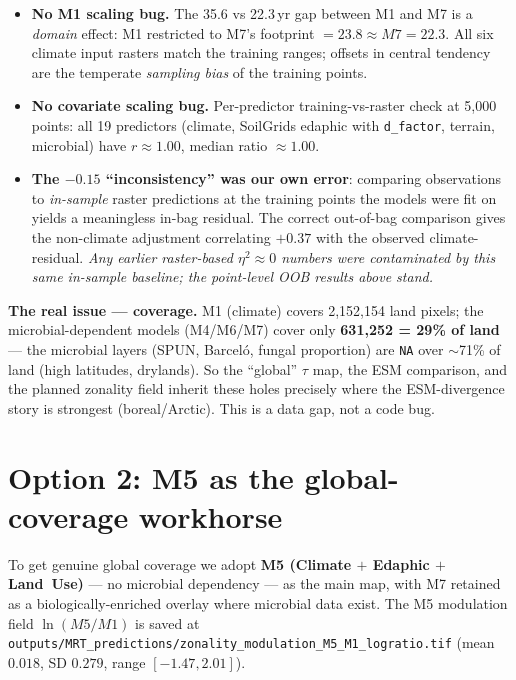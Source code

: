 \documentclass[11pt,a4paper]{article}
\begin{document}
\begin{itemize}[nosep]
  \item \textbf{No M1 scaling bug.} The 35.6 vs 22.3\,yr gap between M1 and M7
  is a \emph{domain} effect: M1 restricted to M7's footprint $=23.8 \approx
  M7=22.3$. All six climate input rasters match the training ranges; offsets in
  central tendency are the temperate \emph{sampling bias} of the training points.
  \item \textbf{No covariate scaling bug.} Per-predictor training-vs-raster check
  at 5{,}000 points: all 19 predictors (climate, SoilGrids edaphic with
  \texttt{d\_factor}, terrain, microbial) have $r\approx1.00$, median ratio
  $\approx1.00$.
  \item \textbf{The $-0.15$ ``inconsistency'' was our own error}: comparing
  observations to \emph{in-sample} raster predictions at the training points the
  models were fit on yields a meaningless in-bag residual. The correct
  out-of-bag comparison gives the non-climate adjustment correlating
  \textbf{$+0.37$} with the observed climate-residual. \emph{Any earlier
  raster-based $\eta^2\!\approx\!0$ numbers were contaminated by this same
  in-sample baseline; the point-level OOB results above stand.}
\end{itemize}

\noindent\textbf{The real issue --- coverage.} M1 (climate) covers
2{,}152{,}154 land pixels; the microbial-dependent models (M4/M6/M7) cover only
\textbf{631{,}252 = 29\% of land} --- the microbial layers (SPUN, Barceló,
fungal proportion) are \texttt{NA} over $\sim$71\% of land (high latitudes,
drylands). So the ``global'' $\tau$ map, the ESM comparison, and the planned
zonality field inherit these holes precisely where the ESM-divergence story is
strongest (boreal/Arctic). This is a data gap, not a code bug.

\section{Option 2: M5 as the global-coverage workhorse}

To get genuine global coverage we adopt \textbf{M5 (Climate $+$ Edaphic $+$
Land~Use)} --- no microbial dependency --- as the main map, with M7 retained as a
biologically-enriched overlay where microbial data exist. The M5 modulation field
$\ln(M5/M1)$ is saved at
\texttt{outputs/MRT\_predictions/zonality\_modulation\_M5\_M1\_logratio.tif}
(mean $0.018$, SD $0.279$, range $[-1.47, 2.01]$).
\end{document}
